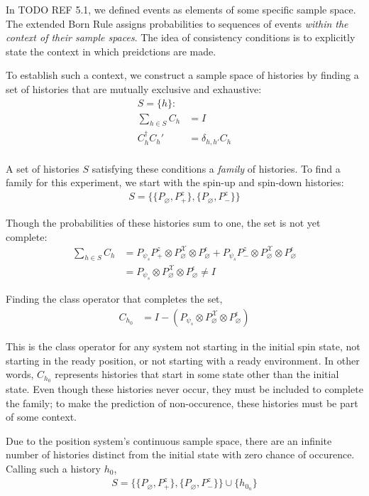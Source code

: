 In TODO REF 5.1, we defined events as elements of some specific sample space. The extended Born Rule assigns probabilities to sequences of events \textit{within the context of their sample spaces}. The idea of consistency conditions is to explicitly state the context in which preidctions are made.

To establish such a context, we construct a sample space of histories by finding a set of histories that are mutually exclusive and exhaustive:
\begin{align}
  S = \{h\}: \\ \nonumber
  \sum_{h \in S} C_h &= I \\ \nonumber
  C_h^\dagger C_h' &= \delta_{h,h'} C_h \\
\end{align}

A set of histories $S$ satisfying these conditions a \textit{family} of histories. To find a family for this experiment, we start with the spin-up and spin-down histories:
\begin{align}
  S = \{\{P_\varnothing, P^z_+\}, \{P_\varnothing, P^z_- \}\}
\end{align}

Though the probabilities of these histories sum to one, the set is not yet complete:
\begin{align}
  \sum_{h \in S} C_h &= P_{\psi_s} P^z_+ \otimes P^\mathcal{X}_\varnothing \otimes P^\epsilon_\varnothing + P_{\psi_s} P^z_- \otimes P^\mathcal{X}_\varnothing \otimes P^\epsilon_\varnothing \\ \nonumber
  &= P_{\psi_s} \otimes P^\mathcal{X}_\varnothing \otimes P^\epsilon_\varnothing \neq I
\end{align}

Finding the class operator that completes the set,
\begin{align}
  C_{h_0} &= I - \left(P_{\psi_s} \otimes P^\mathcal{X}_\varnothing \otimes P^\epsilon_\varnothing \right)
\end{align}

This is the class operator for any system not starting in the initial spin state, not starting in the ready position, or not starting with a ready environment. In other words, $C_{h_0}$ represents histories that start in some state other than the initial state. Even though these histories never occur, they must be included to complete the family; to make the prediction of non-occurence, these histories must be part of some context.

Due to the position system's continuous sample space, there are an infinite number of histories distinct from the initial state with zero chance of occurence. Calling such a history $h_{0}$,
\begin{align}
  S = \{\{P_\varnothing, P^z_+\}, \{P_\varnothing, P^z_- \}\} \cup \{h_{0_n}\}
\end{align}

